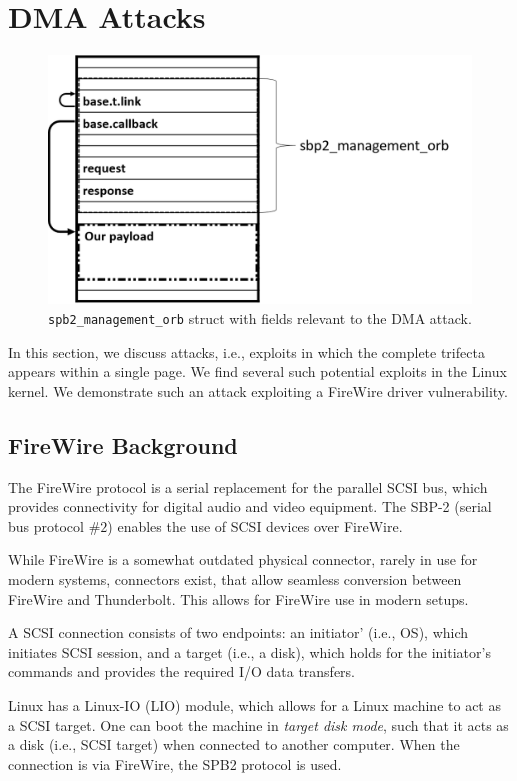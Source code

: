 \section{\Simple{} DMA Attacks}\label{sec:attack_setup}
\begin{figure}
    \centering
    \includegraphics[width=1\linewidth]{figs/sbp.png}
    \caption{\texttt{spb2\_management\_orb} struct with fields relevant to the DMA attack.}
    \label{fig:orb}
\end{figure}
In this section, we discuss \simple{} attacks, i.e., exploits in which the complete trifecta appears within a single page.
We find several such potential \simple{} exploits in the Linux kernel. We demonstrate such an attack exploiting a FireWire driver vulnerability. 

\subsection{FireWire Background}

The FireWire protocol is a serial replacement for the parallel SCSI bus, which provides connectivity for digital audio and video equipment. The SBP-2 (serial bus protocol $\#2$) enables the use of SCSI devices over FireWire. 

While FireWire is a somewhat outdated physical connector, rarely in use for modern systems, connectors exist, that allow seamless conversion between FireWire and Thunderbolt. This allows for FireWire use in modern setups.

A SCSI connection consists of two endpoints: an initiator' (i.e., OS), which initiates SCSI session, and a target (i.e., a disk), which holds for the initiator's commands and provides the required I/O data transfers. 

Linux has a Linux-IO (LIO) module, which allows for a Linux machine to act as a SCSI target. One can boot the machine in \emph{target disk mode}, such that it acts as a disk (i.e., SCSI target) when connected to another computer. When the connection is via FireWire, the SPB2 protocol is used.

